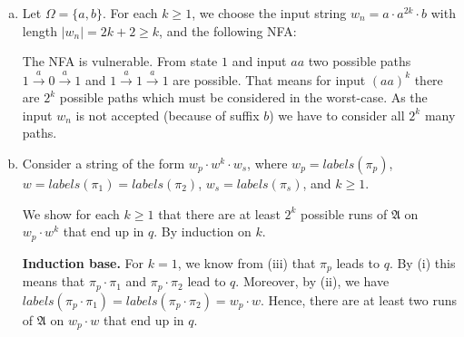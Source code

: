 \begin{solution}
\begin{enumerate}[(a)]
    \item Let $\Omega = \{a,b\}$. For each $k \geq 1$, we choose the input string $w_n = a \cdot a^{2k} \cdot b$ with length $|w_n| = 2k+2 \geq k$, and the following NFA:

    \begin{center}
        \end{center}

    The NFA is vulnerable.
    From state $1$ and input $aa$ two possible paths $1 \overset{a}{\rightarrow} 0 \overset{a}{\rightarrow} 1$ and $1 \overset{a}{\rightarrow} 1 \overset{a}{\rightarrow} 1$ are possible.
    That means for input $(aa)^k$ there are $2^k$ possible paths which must be considered in the worst-case.
    As the input $w_n$ is not accepted (because of suffix $b$) we have to consider all $2^k$ many paths.

    \item Consider a string of the form $w_p \cdot w^k \cdot w_s$, where $w_p = \textit{labels}(\pi_p)$, $w = \textit{labels}(\pi_1) = \textit{labels}(\pi_2)$, $w_s = \textit{labels}(\pi_s)$, and $k \geq 1$.

    We show for each $k \geq 1$ that there are at least $2^{k}$ possible runs of $\mathfrak{A}$ on $w_p \cdot w^{k}$ that end up in $q$. By induction on $k$.

    \textbf{Induction base.} For $k=1$, we know from (iii) that $\pi_p$ leads to $q$.
    By (i) this means that $\pi_p \cdot \pi_1$ and $\pi_p \cdot \pi_2$ lead to $q$.
    Moreover, by (ii), we have $\textit{labels}(\pi_p \cdot \pi_1) = \textit{labels}(\pi_p \cdot \pi_2) = w_p \cdot w$.
    Hence, there are at least two runs of $\mathfrak{A}$ on $w_p \cdot w$ that end up in $q$.


\end{enumerate}
\end{solution}
